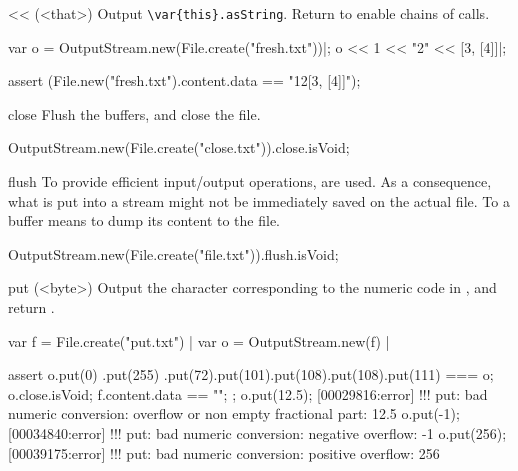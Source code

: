 \begin{urbiscriptapi}
\item[<<](<that>)%
  Output \lstinline|\var{this}.asString|.  Return \this to
  enable chains of calls.
\begin{urbiscript}
var o = OutputStream.new(File.create("fresh.txt"))|;
o << 1 << "2" << [3, [4]]|;

assert (File.new("fresh.txt").content.data == "12[3, [4]]");
\end{urbiscript}

\item[close]
  Flush the buffers, and close the file.
\begin{urbiassert}
OutputStream.new(File.create("close.txt")).close.isVoid;
\end{urbiassert}

\item[flush]%
  To provide efficient input/output operations,  are
  used.  As a consequence, what is put into a stream might not be
  immediately saved on the actual file.  To  a buffer means to
  dump its content to the file.
\begin{urbiassert}
OutputStream.new(File.create("file.txt")).flush.isVoid;
\end{urbiassert}

\item[put](<byte>)%
  Output the character corresponding to the numeric code  in
  \this, and return \this.
\begin{urbiscript}[firstnumber=1]
var f = File.create("put.txt") |
var o = OutputStream.new(f) |

assert
{
  o.put(0)
   .put(255)
   .put(72).put(101).put(108).put(108).put(111)
  === o;
  o.close.isVoid;
  f.content.data == "\0\xffHello";
};
o.put(12.5);
[00029816:error] !!! put: bad numeric conversion: overflow or non empty fractional part: 12.5
o.put(-1);
[00034840:error] !!! put: bad numeric conversion: negative overflow: -1
o.put(256);
[00039175:error] !!! put: bad numeric conversion: positive overflow: 256
\end{urbiscript}

\end{urbiscriptapi}


